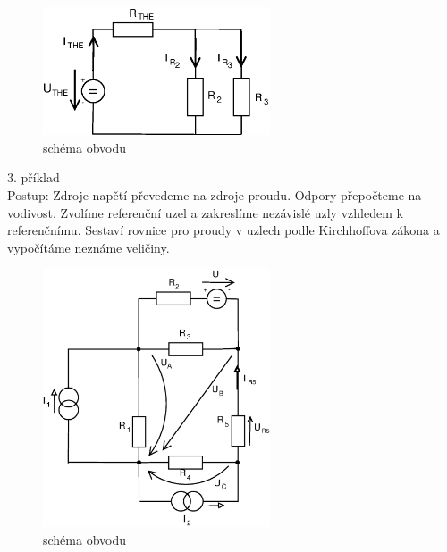 \documentclass[10pt,a4paper]{article}
\begin{document}
  \begin{figure}[ht]
    \begin{center}
     \includegraphics[width=0.6\textwidth]{2025.eps}
     \caption{schéma obvodu}
    \end{center}
   \end{figure} 
  \newpage
  
   \begin{flushleft}
    {\large 3. příklad}
    \\[10pt]
    Postup: Zdroje napětí převedeme na zdroje proudu. Odpory přepočteme na vodivost. Zvolíme referenční uzel a zakreslíme nezávislé uzly vzhledem k referenčnímu. Sestaví rovnice pro proudy v uzlech podle Kirchhoffova zákona a vypočítáme neznáme veličiny.
   \\[15pt]
    \end{flushleft}
  
 \begin{figure}[ht]
    \begin{center}
     \includegraphics[width=0.6\textwidth]{2027.eps}
     \caption{schéma obvodu}
    \end{center}
   \end{figure}   
\end{document}
